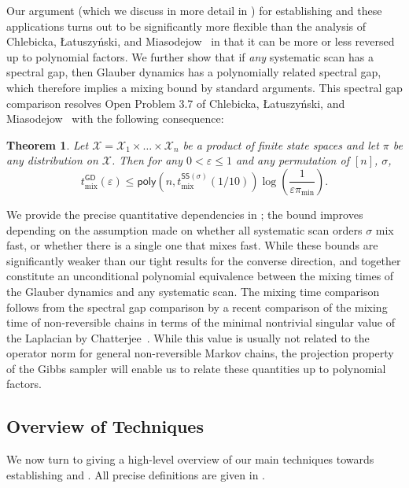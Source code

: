 \documentclass[11pt]{article}
\newtheorem{theorem}{Theorem}[section]
\begin{document}
Our argument (which we discuss in more detail in ) for establishing  and these applications turns out to be significantly more flexible than the analysis of Chlebicka,  Łatuszy\'nski, and Miasodejow~\cite{chlebicka} in that it can be more or less reversed up to polynomial factors. We further show that if \emph{any} systematic scan has a spectral gap, then Glauber dynamics has a polynomially related spectral gap, which therefore implies a mixing bound by standard arguments. This spectral gap comparison resolves Open Problem 3.7 of Chlebicka,  Łatuszy\'nski, and Miasodejow~\cite{chlebicka} with the following consequence:

\begin{theorem}
\label{thm:mixing_2}
         Let $\mathcal{X}=\mathcal{X}_1\times \ldots\times \mathcal{X}_n$ be a product of finite state spaces and let $\pi$ be any distribution on $\mathcal{X}$. Then for any $0<\varepsilon\leq 1$ and any permutation of $[n]$, $\sigma$,  
    \begin{equation*}
        t^{\mathsf{GD}}_{\mathrm{mix}}(\varepsilon)\leq \mathsf{poly}\left(n,t^{\mathsf{SS}(\sigma)}_{\mathrm{mix}}(1/10)\right)\log\left(\frac{1}{\varepsilon\pi_{\mathrm{min}}}\right).
    \end{equation*}
\end{theorem}

We provide the precise quantitative dependencies in ; the bound improves depending on the assumption made on whether all systematic scan orders $\sigma$ mix fast, or whether there is a single one that mixes fast. While these bounds are significantly weaker than our tight results for the converse direction,  and  together constitute an unconditional polynomial equivalence between the mixing times of the Glauber dynamics and any systematic scan. The mixing time comparison follows from the spectral gap comparison by a recent comparison of the mixing time of non-reversible chains in terms of the minimal nontrivial singular value of the Laplacian by Chatterjee~\cite{chatterjee2023spectral}. While this value is usually not related to the operator norm for general non-reversible Markov chains, the projection property of the Gibbs sampler will enable us to relate these quantities up to polynomial factors.\\


\subsection{Overview of Techniques}
\label{sec:overview_tech}
We now turn to giving a high-level overview of our main techniques towards establishing  and . All precise definitions are given in .
\end{document}

